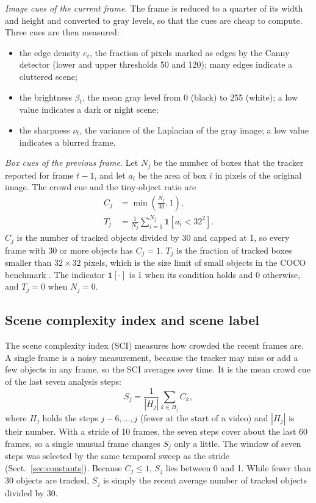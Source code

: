 \documentclass[pdflatex,sn-mathphys-num,iicol]{sn-jnl}
\begin{document}
\emph{Image cues of the current frame.} The frame is reduced to a quarter of
its width and height and converted to gray levels, so that the cues are cheap
to compute. Three cues are then measured:
\begin{itemize}
\item the edge density $e_t$, the fraction of pixels marked as edges by the
      Canny detector (lower and upper thresholds 50 and 120); many edges
      indicate a cluttered scene;
\item the brightness $\beta_t$, the mean gray level from 0 (black) to 255
      (white); a low value indicates a dark or night scene;
\item the sharpness $\nu_t$, the variance of the Laplacian of the gray image;
      a low value indicates a blurred frame.
\end{itemize}

\emph{Box cues of the previous frame.} Let $N_j$ be the number of boxes that
the tracker reported for frame $t-1$, and let $a_i$ be the area of box $i$ in
pixels of the original image. The crowd cue and the tiny-object ratio are
\begin{align}
C_j&=\min\!\left(\frac{N_j}{30},1\right),\label{eq:crowd}\\
T_j&=\frac{1}{N_j}\sum_{i=1}^{N_j}\mathbf{1}\!\left[a_i<32^2\right].\label{eq:tiny}
\end{align}
$C_j$ is the number of tracked objects divided by 30 and capped at 1, so every
frame with 30 or more objects has $C_j=1$. $T_j$ is the fraction of tracked
boxes smaller than $32\times32$ pixels, which is the size limit of small
objects in the COCO benchmark \cite{lin2014coco}. The indicator
$\mathbf{1}[\cdot]$ is 1 when its condition holds and 0 otherwise, and $T_j=0$
when $N_j=0$.

\subsection{Scene complexity index and scene label}\label{sec:sci}
The scene complexity index (SCI) measures how crowded the recent frames are.
A single frame is a noisy measurement, because the tracker may miss or add a
few objects in any frame, so the SCI averages over time. It is the mean crowd
cue of the last seven analysis steps:
\begin{equation}
S_j=\frac{1}{|H_j|}\sum_{k\in H_j} C_k,
\label{eq:sci}
\end{equation}
where $H_j$ holds the steps $j-6,\dots,j$ (fewer at the start of a video) and
$|H_j|$ is their number. With a stride of 10 frames, the seven steps cover
about the last 60 frames, so a single unusual frame changes $S_j$ only a little. The
window of seven steps was selected by the same temporal sweep as the stride
(Sect.~\ref{sec:constants}). Because $C_j\le1$, $S_j$ lies between 0 and 1.
While fewer than 30 objects are tracked, $S_j$ is simply the recent average
number of tracked objects divided by 30.
\end{document}
